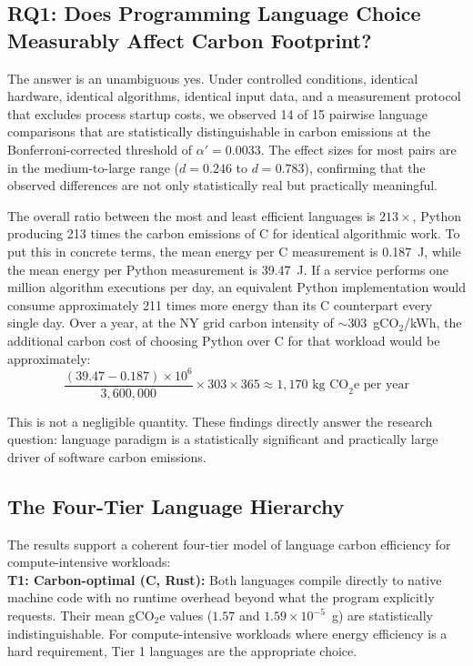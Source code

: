 
\subsection{RQ1: Does Programming Language Choice Measurably Affect Carbon Footprint?}


The answer is an unambiguous yes. Under controlled conditions, identical hardware, identical algorithms, identical input data, and a measurement protocol that excludes process startup costs, we observed 14 of 15 pairwise language comparisons that are statistically distinguishable in carbon emissions at the Bonferroni-corrected threshold of $\alpha' = 0.0033$. The effect sizes for most pairs are in the medium-to-large range ($d = 0.246$ to $d = 0.783$), confirming that the observed differences are not only statistically real but practically meaningful.

The overall ratio between the most and least efficient languages is $213\times$, Python producing 213 times the carbon emissions of C for identical algorithmic work. To put this in concrete terms, the mean energy per C measurement is 0.187~J, while the mean energy per Python measurement is 39.47~J. If a service performs one million algorithm executions per day, an equivalent Python implementation would consume approximately 211 times more energy than its C counterpart every single day. Over a year, at the NY grid carbon intensity of $\sim$303~gCO$_2$/kWh, the additional carbon cost of choosing Python over C for that workload would be approximately:
\begin{equation*}
    \frac{(39.47 - 0.187) \times 10^6}{3{,}600{,}000} \times 303 \times 365 \approx 1{,}170 \text{ kg CO}_2\text{e per year}
\end{equation*}

This is not a negligible quantity. These findings directly answer the research question: language paradigm is a statistically significant and practically large driver of software carbon emissions.


\subsection{The Four-Tier Language Hierarchy}
 
The results support a coherent four-tier model of language carbon efficiency for compute-intensive workloads: \\
 
\textbf{T1: Carbon-optimal (C, Rust):} Both languages compile directly to native machine code with no runtime overhead beyond what the program explicitly requests. Their mean gCO$_2$e values ($1.57$ and $1.59 \times 10^{-5}$~g) are statistically indistinguishable. For compute-intensive workloads where energy efficiency is a hard requirement, Tier 1 languages are the appropriate choice. \\
 
